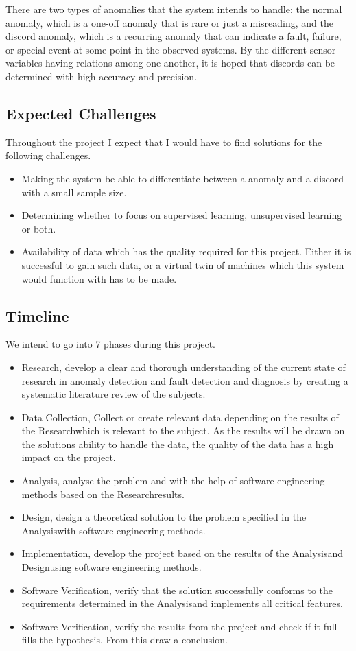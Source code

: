 \documentclass[a4paper,8pt]{article}
\newcommand{\Phases}{7 }
\newcommand{\phaseq}{Research}
\newcommand{\phasew}{Data Collection}
\newcommand{\phasee}{Analysis}
\newcommand{\phaser}{Design}
\newcommand{\phaset}{Implementation}
\newcommand{\phasey}{Software Verification}
\begin{document}
		There are two types of anomalies that the system intends to handle: the normal anomaly, which is a one-off anomaly that is rare or just a misreading, and the discord anomaly, which is a recurring anomaly that can indicate a fault, failure, or special event at some point in the observed systems. By the different sensor variables having relations among one another, it is hoped that discords can be determined with high accuracy and precision.
		
	\subsection{Expected Challenges}
		Throughout the project I expect that I would have to find solutions for the following challenges.
		\begin{itemize}
			\item Making the system be able to differentiate between a anomaly and a discord with a small sample size.
			\item Determining whether to focus on supervised learning, unsupervised learning or both.
			\item Availability of data which has the quality required for this project. Either it is successful to gain such data, or a virtual twin of machines which this system would function with has to be made.
		\end{itemize}
		
	\subsection{Timeline}
	We intend to go into \Phases phases during this project.
		\begin{itemize}
			\item \phaseq, develop a clear and thorough understanding of the current state of research in anomaly detection and fault detection and diagnosis by creating a systematic literature review of the subjects.
			\item \phasew, Collect or create relevant data depending on the results of the \phaseq which is relevant to the subject. As the results will be drawn on the solutions ability to handle the data, the quality of the data has a high impact on the project.
			\item \phasee, analyse the problem and with the help of software engineering methods based on the \phaseq \space results.
			\item \phaser, design a theoretical solution to the problem specified in the \phasee with software engineering methods.
			\item \phaset, develop the project based on the results of the \phasee and \phaser using software engineering methods.
			\item \phasey, verify that the solution successfully conforms to the requirements determined in the \phasee and implements all critical features.
			\item \phasey, verify the results from the project and check if it full fills the hypothesis. From this draw a conclusion.
		\end{itemize}
	
\end{document}
